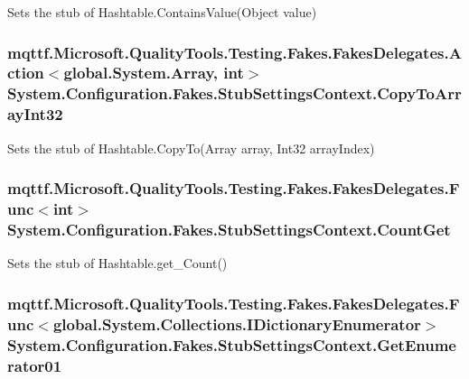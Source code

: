 Sets the stub of Hashtable.\-Contains\-Value(\-Object value)

\hypertarget{class_system_1_1_configuration_1_1_fakes_1_1_stub_settings_context_ae9ab52fa0a381d54796510720996a60a}{
\subsubsection[{Copy\-To\-Array\-Int32}]{\setlength{\rightskip}{0pt plus 5cm}mqttf.\-Microsoft.\-Quality\-Tools.\-Testing.\-Fakes.\-Fakes\-Delegates.\-Action$<$global.\-System.\-Array, int$>$ System.\-Configuration.\-Fakes.\-Stub\-Settings\-Context.\-Copy\-To\-Array\-Int32}}\label{class_system_1_1_configuration_1_1_fakes_1_1_stub_settings_context_ae9ab52fa0a381d54796510720996a60a}


Sets the stub of Hashtable.\-Copy\-To(\-Array array, Int32 array\-Index)

\hypertarget{class_system_1_1_configuration_1_1_fakes_1_1_stub_settings_context_a0a0a7441f0ac058729eeb951f7b7e01a}{
\subsubsection[{Count\-Get}]{\setlength{\rightskip}{0pt plus 5cm}mqttf.\-Microsoft.\-Quality\-Tools.\-Testing.\-Fakes.\-Fakes\-Delegates.\-Func$<$int$>$ System.\-Configuration.\-Fakes.\-Stub\-Settings\-Context.\-Count\-Get}}\label{class_system_1_1_configuration_1_1_fakes_1_1_stub_settings_context_a0a0a7441f0ac058729eeb951f7b7e01a}


Sets the stub of Hashtable.\-get\-\_\-\-Count()

\hypertarget{class_system_1_1_configuration_1_1_fakes_1_1_stub_settings_context_a08b6b4232f08bad2b17c403bb315a64b}{
\subsubsection[{Get\-Enumerator01}]{\setlength{\rightskip}{0pt plus 5cm}mqttf.\-Microsoft.\-Quality\-Tools.\-Testing.\-Fakes.\-Fakes\-Delegates.\-Func$<$global.\-System.\-Collections.\-I\-Dictionary\-Enumerator$>$ System.\-Configuration.\-Fakes.\-Stub\-Settings\-Context.\-Get\-Enumerator01}}\label{class_system_1_1_configuration_1_1_fakes_1_1_stub_settings_context_a08b6b4232f08bad2b17c403bb315a64b}


